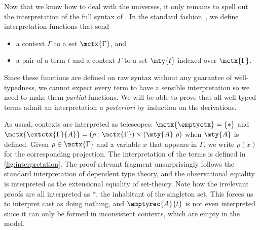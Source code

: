 Now that we know how to deal with the universes, it only
remains to spell out the interpretation of the full syntax of \SetoidCC.
%
In the standard fashion~, we define interpretation functions that send
\begin{itemize}
  \item a context \( \Gamma \) to a set \( \mctx{\Gamma} \), and
  \item a pair of a term \( t \) and a context \( \Gamma \) to a set \( \mty{t} \) indexed over \( \mctx{\Gamma} \).
\end{itemize}
Since these functions are defined on raw syntax without any guarantee of
well-typedness, we cannot expect every term to have a sensible interpretation
so we need to make them \emph{partial} functions. We will be able to prove
that all well-typed terms admit an interpretation \textit{a posteriori} by
induction on the derivations.

As usual, contexts are interpreted as telescopes:
\( \mctx{\emptyctx} = \{ * \} \) and
\( \mctx{\extctx{\Gamma}{A}} = (\rho : \mctx{\Gamma})\times (\mty{A}\ \rho) \)
when \( \mty{A} \) is defined.
%
Given \( \rho \in \mctx{\Gamma} \) and a variable \( x \) that appears in
\( \Gamma \), we write \( \rho(x) \) for the corresponding projection.
%
The interpretation of the terms is defined in
\cref{fig:interpretation}. The proof-relevant fragment unsurprisingly
follows the standard interpretation of dependent type theory, and the
observational equality is interpreted as the extensional equality of
set-theory.
%
Note how the irrelevant proofs are all interpreted as \( * \), the inhabitant
of the singleton set. This forces us to interpret cast as doing nothing, and \( \emptyrec{A}{t} \) is not even interpreted since it can only be formed in inconsistent contexts, which are empty in the model.

